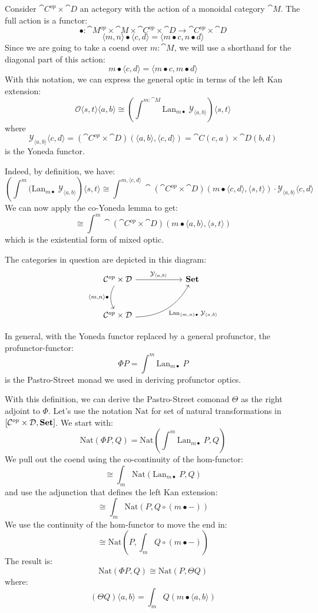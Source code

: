 \documentclass[DaoFP]{subfiles}
\begin{document}
Consider $\cat C^{op} \times \cat D$ an actegory with the action of a monoidal category $\cat M$. The full action is a functor:
\[ \bullet \colon \cat M^{op} \times \cat M \times \cat C^{op} \times \cat D \to  \cat C^{op} \times \cat D \]
\[  \langle m, n  \rangle \bullet \langle c, d \rangle = \langle m \bullet c, n \bullet d \rangle \]
Since we are going to take a coend over $m \colon \cat M$, we will use a shorthand for the diagonal part of this action:
\[ m \bullet \langle c, d \rangle = \langle m \bullet c, m \bullet d \rangle \]
With this notation, we can express the general optic in terms of the left Kan extension:
\[ \mathcal{O} \langle s, t \rangle \langle a, b \rangle \cong \left(\int^{m \colon \cat M} \text{Lan}_{m \bullet} \;\mathcal Y_{\langle a, b \rangle}\right) \langle s, t \rangle \]
where
\[ \mathcal Y_{\langle a, b \rangle} \langle c, d \rangle = (\cat C^{op} \times \cat D)(\langle a, b \rangle, \langle c, d \rangle) = \cat C(c, a) \times \cat D(b, d) \]
is the Yoneda functor.

Indeed, by definition, we have:
\[ \left( \int^m (\text{Lan}_{m \bullet} \; \mathcal Y_{\langle a, b \rangle} \right) \langle s, t \rangle \cong 
\int^{m, \langle c, d \rangle} \cat (\cat C^{op} \times \cat D)(m \bullet \langle c, d \rangle, \langle s, t \rangle) \cdot \mathcal Y_{\langle a, b \rangle} \langle c, d \rangle \]
We can now apply the co-Yoneda lemma to get:
\[ \cong \int^m \cat (\cat C^{op} \times \cat D)(m \bullet \langle a, b \rangle, \langle s, t \rangle)\]
which is the existential form of mixed optic.

The categories in question are depicted in this diagram:
\[
 \begin{tikzcd} [row sep=1cm, column sep=1cm]
 \cat C^{op} \times \cat D
 \arrow[rr, "\mathcal Y_{\langle a, b \rangle}", "" {name=ID, below} ]
 \arrow[d, bend right, "{\langle m, n \rangle \bullet}"']
 && \Set
 \\
 \cat C^{op} \times \cat D
  \arrow[urr, bend right, "{\text{Lan}_{\langle m, n \rangle \bullet}\; \mathcal Y_{\langle a, b \rangle}}"']
 \end{tikzcd}
\]

In general, with the Yoneda functor replaced by a general profunctor, the profunctor-functor:
\[ \Phi P = \int^m \text{Lan}_{m \bullet} \; P \]
is the Pastro-Street monad we used in deriving profunctor optics.

With this definition, we can derive the Pastro-Street comonad $\Theta$ as the right adjoint to $\Phi$. Let's use the notation $\text{Nat}$ for set of natural transformations in $[\mathcal{C}^{op} \times \mathcal{D}, \mathbf{Set}]$. We start with:
\[ \text{Nat}(\Phi P, Q) = \text{Nat}(\int^m \text{Lan}_{m \bullet} \;P, Q) \]
We pull out the coend using the co-continuity of the hom-functor:
\[\cong \int_m\text{Nat}( \text{Lan}_{m \bullet}\; P, Q) \]
 and use the adjunction that defines the left Kan extension:
\[ \cong \int_m\text{Nat}(P, Q \circ (m \bullet -)) \]
We use the continuity of the hom-functor to move the end in:
\[ \cong\text{Nat}(P,  \int_m Q \circ (m \bullet -)) \]
The result is:
\[ \text{Nat}(\Phi P, Q) \cong\text{Nat}(P,  \Theta Q) \]
where:
\[ (\Theta Q)\langle a, b \rangle = \int_m Q (m \bullet \langle a, b \rangle) \]
\end{document}
